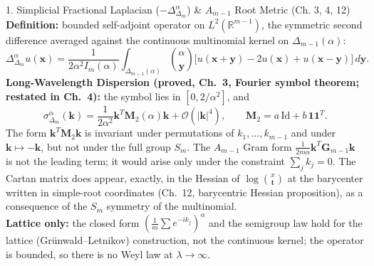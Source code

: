 \documentclass[11pt,a4paper,oneside]{article}
\begin{document}
\begin{conceptbox}{{1. Simplicial Fractional Laplacian ($-\Delta_{\Delta_m}^\alpha$) \& $A_{m-1}$ Root Metric (Ch. 3, 4, 12)}}
\textbf{Definition:} bounded self-adjoint operator on $L^2(\mathbb{R}^{m-1})$, the symmetric second difference averaged against the continuous multinomial kernel on $\Delta_{m-1}(\alpha)$:
$$\Delta_{\Delta_m}^\alpha u(\mathbf{x}) = \frac{1}{2\alpha^2 I_m(\alpha)}\int_{\Delta_{m-1}(\alpha)} \binom{\alpha}{\mathbf{y}} \big[u(\mathbf{x}+\mathbf{y}) - 2u(\mathbf{x}) + u(\mathbf{x}-\mathbf{y})\big]\, d\mathbf{y}.$$
\textbf{Long-Wavelength Dispersion (proved, Ch.~3, Fourier symbol theorem; restated in Ch.~4):} the symbol lies in $[0,2/\alpha^2]$, and
$$\sigma_{\Delta_m}^\alpha(\mathbf{k}) = \frac{1}{2\alpha^2} \mathbf{k}^T \mathbf{M}_2(\alpha) \mathbf{k} + \mathcal{O}(|\mathbf{k}|^4), \qquad \mathbf{M}_2 = a\,\mathrm{Id} + b\,\mathbf{1}\mathbf{1}^T.$$
The form $\mathbf{k}^T\mathbf{M}_2\mathbf{k}$ is invariant under permutations of $k_1, \dots, k_{m-1}$ and under $\mathbf{k} \mapsto -\mathbf{k}$, but not under the full group $S_m$. The $A_{m-1}$ Gram form $\frac{1}{2m\alpha}\mathbf{k}^T\mathbf{G}_{m-1}\mathbf{k}$ is not the leading term; it would arise only under the constraint $\sum_j k_j = 0$. The Cartan matrix does appear, exactly, in the Hessian of $\log\binom{x}{\mathbf{t}}$ at the barycenter written in simple-root coordinates (Ch.~12, barycentric Hessian proposition), as a consequence of the $S_m$ symmetry of the multinomial.\\
\textbf{Lattice only:} the closed form $(\frac1m\sum e^{-ik_j})^\alpha$ and the semigroup law hold for the lattice (Gr\"unwald--Letnikov) construction, not the continuous kernel; the operator is bounded, so there is no Weyl law at $\lambda \to \infty$.
\end{conceptbox}
\end{document}
